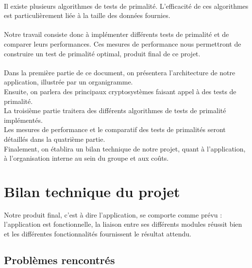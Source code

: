 	\paragraph{}Il existe plusieurs algorithmes de tests de primalité. L'efficacité de ces algorithmes est particulièrement liée à la taille des données fournies. 
	\paragraph{}Notre travail consiste donc à implémenter différents tests de primalité et de comparer leurs performances. Ces mesures de performance nous permettront de construire un test de primalité optimal, produit final de ce projet. 
	\paragraph{}Dans la première partie de ce document, on présentera l'architecture de notre application, illustrée par un organigramme.\\
	Ensuite, on parlera des principaux cryptosystèmes faisant appel à des tests de primalité. \\
	La troisième partie traitera des différents algorithmes de tests de primalité implémentés.\\
	Les mesures de performance et le comparatif des tests de primalités seront détaillés dans la quatrième partie.\\
	Finalement, on établira un bilan technique de notre projet, quant à l'application, à l'organisation interne au sein du groupe et aux coûts.
	
	
	
	
	
	
	
	
	
	
	
	
	
	\section{Bilan technique du projet}
		Notre produit final, c'est à dire l'application, se comporte comme prévu : l'application est fonctionnelle, la liaison entre ses différents modules réussit bien et les différentes fonctionnalités fournissent le résultat attendu.		

		\subsection{Problèmes rencontrés}

